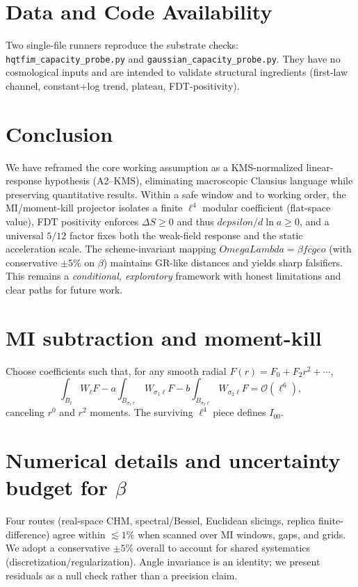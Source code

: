 \documentclass[aps,prd,onecolumn,superscriptaddress,nofootinbib]{revtex4-2}
\def\OmL{OmegaLambda}%
\def\cgeo{cgeo}%
\def\eps{epsilon}%
\def\Omega_\Lambda{OmegaLambda}%
\providecommand{\OmL}{\Omega_\Lambda}
\providecommand{\cgeo}{c_{\rm geo}}
\providecommand{\eps}{\varepsilon}
\begin{document}
\section{Data and Code Availability}
\label{sec:data}
Two single-file runners reproduce the substrate checks: \texttt{hqtfim\_capacity\_probe.py} and \texttt{gaussian\_capacity\_probe.py}. They have no cosmological inputs and are intended to validate structural ingredients (first-law channel, constant+log trend, plateau, FDT-positivity).

\section{Conclusion}
We have reframed the core working assumption as a KMS-normalized linear-response hypothesis (A2--KMS), eliminating macroscopic Clausius language while preserving quantitative results. Within a safe window and to working order, the MI/moment-kill projector isolates a finite \(\ell^4\) modular coefficient (flat-space value), FDT positivity enforces \(\Delta S\ge 0\) and thus \(d\eps/d\ln a\ge 0\), and a universal \(5/12\) factor fixes both the weak-field response and the static acceleration scale. The scheme-invariant mapping \(\OmL=\beta f \cgeo\) (with conservative \(\pm 5\%\) on \(\beta\)) maintains GR-like distances and yields sharp falsifiers. This remains a \emph{conditional, exploratory} framework with honest limitations and clear paths for future work.

\appendix

\section{MI subtraction and moment-kill}
\label{app:MI}
Choose coefficients such that, for any smooth radial \(F(r)=F_0+F_2 r^2+\cdots\),
\[
\int_{B_\ell}W_\ell F - a\!\int_{B_{\sigma_1\ell}}W_{\sigma_1\ell}F - b\!\int_{B_{\sigma_2\ell}}W_{\sigma_2\ell}F
=\mathcal O(\ell^6),
\]
canceling \(r^0\) and \(r^2\) moments. The surviving \(\ell^4\) piece defines \(I_{00}\).

\section{Numerical details and uncertainty budget for \texorpdfstring{$\beta$}{beta}}
\label{app:beta}
Four routes (real-space CHM, spectral/Bessel, Euclidean slicings, replica finite-difference) agree within \(\lesssim 1\%\) when scanned over MI windows, gaps, and grids. We adopt a conservative \(\pm 5\%\) overall to account for shared systematics (discretization/regularization). Angle invariance is an identity; we present residuals as a null check rather than a precision claim.
\end{document}

